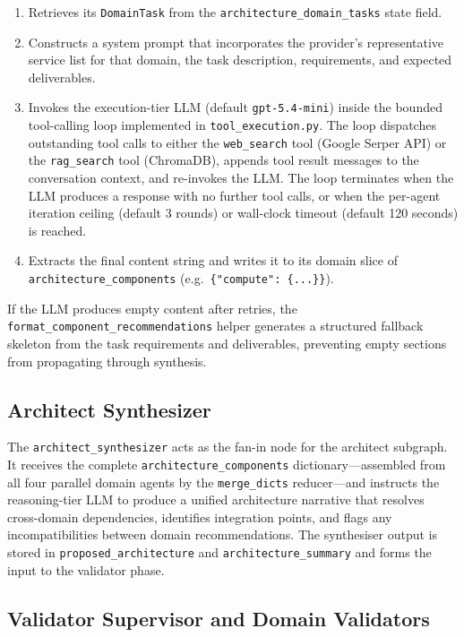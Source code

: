\begin{enumerate}
    \item Retrieves its \texttt{DomainTask} from the \texttt{architecture\_domain\_tasks} state field.
    \item Constructs a system prompt that incorporates the provider's representative service list for that domain, the task description, requirements, and expected deliverables.
    \item Invokes the execution-tier LLM (default \texttt{gpt-5.4-mini}) inside the bounded tool-calling loop implemented in \texttt{tool\_execution.py}. The loop dispatches outstanding tool calls to either the \texttt{web\_search} tool (Google Serper API) or the \texttt{rag\_search} tool (ChromaDB), appends tool result messages to the conversation context, and re-invokes the LLM. The loop terminates when the LLM produces a response with no further tool calls, or when the per-agent iteration ceiling (default 3 rounds) or wall-clock timeout (default 120 seconds) is reached.
    \item Extracts the final content string and writes it to its domain slice of \texttt{architecture\_components} (e.g.\ \texttt{\{"compute": \{...\}\}}).
\end{enumerate}

If the LLM produces empty content after retries, the \texttt{format\_component\_recommendations} helper generates a structured fallback skeleton from the task requirements and deliverables, preventing empty sections from propagating through synthesis.

\subsection{Architect Synthesizer}

The \texttt{architect\_synthesizer} acts as the fan-in node for the architect subgraph. It receives the complete \texttt{architecture\_components} dictionary---assembled from all four parallel domain agents by the \texttt{merge\_dicts} reducer---and instructs the reasoning-tier LLM to produce a unified architecture narrative that resolves cross-domain dependencies, identifies integration points, and flags any incompatibilities between domain recommendations. The synthesiser output is stored in \texttt{proposed\_architecture} and \texttt{architecture\_summary} and forms the input to the validator phase.

\subsection{Validator Supervisor and Domain Validators}

